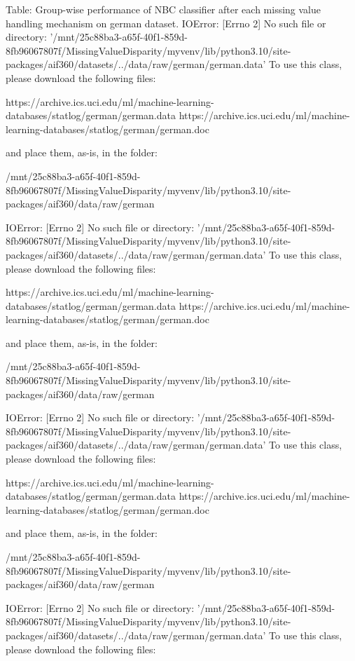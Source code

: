 Table: Group-wise performance of NBC classifier after
each missing value handling mechanism on german dataset.
\midrule
{}IOError: [Errno 2] No such file or directory: '/mnt/25c88ba3-a65f-40f1-859d-8fb96067807f/MissingValueDisparity/myvenv/lib/python3.10/site-packages/aif360/datasets/../data/raw/german/german.data'
To use this class, please download the following files:

	https://archive.ics.uci.edu/ml/machine-learning-databases/statlog/german/german.data
	https://archive.ics.uci.edu/ml/machine-learning-databases/statlog/german/german.doc

and place them, as-is, in the folder:

	/mnt/25c88ba3-a65f-40f1-859d-8fb96067807f/MissingValueDisparity/myvenv/lib/python3.10/site-packages/aif360/data/raw/german

IOError: [Errno 2] No such file or directory: '/mnt/25c88ba3-a65f-40f1-859d-8fb96067807f/MissingValueDisparity/myvenv/lib/python3.10/site-packages/aif360/datasets/../data/raw/german/german.data'
To use this class, please download the following files:

	https://archive.ics.uci.edu/ml/machine-learning-databases/statlog/german/german.data
	https://archive.ics.uci.edu/ml/machine-learning-databases/statlog/german/german.doc

and place them, as-is, in the folder:

	/mnt/25c88ba3-a65f-40f1-859d-8fb96067807f/MissingValueDisparity/myvenv/lib/python3.10/site-packages/aif360/data/raw/german

IOError: [Errno 2] No such file or directory: '/mnt/25c88ba3-a65f-40f1-859d-8fb96067807f/MissingValueDisparity/myvenv/lib/python3.10/site-packages/aif360/datasets/../data/raw/german/german.data'
To use this class, please download the following files:

	https://archive.ics.uci.edu/ml/machine-learning-databases/statlog/german/german.data
	https://archive.ics.uci.edu/ml/machine-learning-databases/statlog/german/german.doc

and place them, as-is, in the folder:

	/mnt/25c88ba3-a65f-40f1-859d-8fb96067807f/MissingValueDisparity/myvenv/lib/python3.10/site-packages/aif360/data/raw/german

IOError: [Errno 2] No such file or directory: '/mnt/25c88ba3-a65f-40f1-859d-8fb96067807f/MissingValueDisparity/myvenv/lib/python3.10/site-packages/aif360/datasets/../data/raw/german/german.data'
To use this class, please download the following files:

